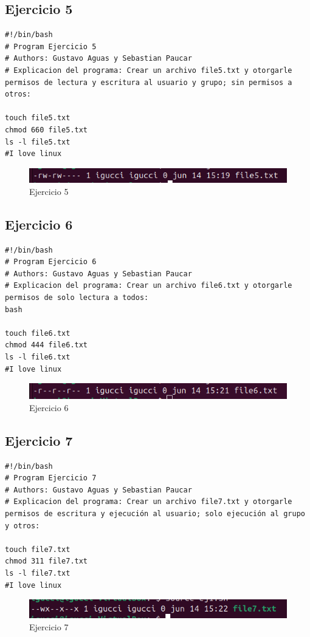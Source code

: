 \documentclass[11pt,twoside]{book}
\begin{document}
\subsection{Ejercicio 5}
\begin{lstlisting}
#!/bin/bash
# Program Ejercicio 5
# Authors: Gustavo Aguas y Sebastian Paucar
# Explicacion del programa: Crear un archivo file5.txt y otorgarle permisos de lectura y escritura al usuario y grupo; sin permisos a otros:

touch file5.txt
chmod 660 file5.txt
ls -l file5.txt
#I love linux
\end{lstlisting}
\begin{figure}[h]
    \centering
    \includegraphics[width=1\linewidth]{pnum/ej5.png}
    \caption{Ejercicio 5}
\end{figure}

\subsection{Ejercicio 6}

\begin{lstlisting}
#!/bin/bash
# Program Ejercicio 6
# Authors: Gustavo Aguas y Sebastian Paucar
# Explicacion del programa: Crear un archivo file6.txt y otorgarle permisos de solo lectura a todos:
bash

touch file6.txt
chmod 444 file6.txt
ls -l file6.txt
#I love linux
\end{lstlisting}
\begin{figure}[h]
    \centering
    \includegraphics[width=1\linewidth]{pnum/ej6.png}
    \caption{Ejercicio 6}
\end{figure}

\subsection{Ejercicio 7}
\begin{lstlisting}
#!/bin/bash
# Program Ejercicio 7
# Authors: Gustavo Aguas y Sebastian Paucar
# Explicacion del programa: Crear un archivo file7.txt y otorgarle permisos de escritura y ejecución al usuario; solo ejecución al grupo y otros:

touch file7.txt
chmod 311 file7.txt
ls -l file7.txt
#I love linux
\end{lstlisting}
\begin{figure}[h]
    \centering
    \includegraphics[width=1\linewidth]{pnum/ej7.png}
    \caption{Ejercicio 7}
\end{figure}
\end{document}
